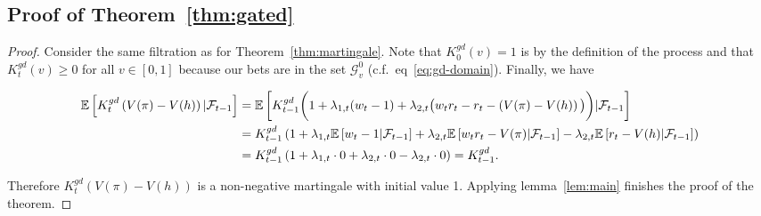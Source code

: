 \subsection{Proof of Theorem~\ref{thm:gated}}
\begin{proof}

Consider the same filtration as for Theorem~\ref{thm:martingale}.
Note that $K_0^{gd}(v)=1$ is by 
the definition of the process and that $K_t^{gd}(v)\geq 0$ for all 
$v \in [0,1]$ because our bets 
are in the set $\mathcal{G}_v^0$ (c.f.\ eq~\eqref{eq:gd-domain}).
Finally, we have
\begin{small}
\begin{align*}
    \mathbb{E}\left[K_t^{gd}\left(V(\pi)-V(h)\right)|\mathcal{F}_{t-1}\right]
    &= \mathbb{E}\left[K_{t-1}^{gd}\bigg(1+\lambda_{1,t}(w_t-1)+\lambda_{2,t}
    \big(w_t r_t - r_t - \left(V(\pi)-V(h)\right)\big)\bigg)|\mathcal{F}_{t-1}\right]\\
    &= K_{t-1}^{gd}\left(1+\lambda_{1,t} \mathbb{E}\left[w_t-1|\mathcal{F}_{t-1}\right]
    +\lambda_{2,t}\mathbb{E}\left[w_t r_t - V(\pi)|\mathcal{F}_{t-1}\right]
    -\lambda_{2,t}\mathbb{E}\left[r_t - V(h)|\mathcal{F}_{t-1}\right]\right)\\
    &= K_{t-1}^{gd}\left(1+\lambda_{1,t} \cdot 0 + \lambda_{2,t} \cdot 0 - \lambda_{2,t} \cdot 0\right) = K_{t-1}^{gd}.
\end{align*}
\end{small}
Therefore $K_t^{gd}(V(\pi)-V(h))$ is a non-negative martingale with initial
value 1. Applying 
lemma~\ref{lem:main} finishes the proof of the theorem.
\end{proof}

